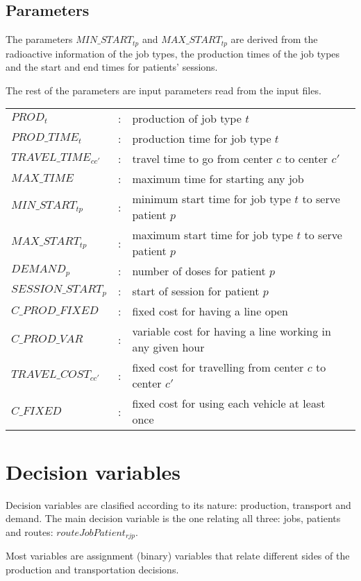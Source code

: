 \subsection{Parameters}

The parameters $MIN\_START_{tp}$ and $MAX\_START_{tp}$ are derived from the radioactive information of the job types, the production times of the job types and the start and end times for patients' sessions.

The rest of the parameters are input parameters read from the input files.

\begin{tabular}{p{40mm}lp{80mm}}
$PROD_t$ 								& : &		production of job type $t$ \\
$PROD\_TIME_t$ 					& : &	production time for job type $t$ \\
$TRAVEL\_TIME_{cc'}$ 		& : &	travel time to go from center $c$ to center $c'$ \\
$MAX\_TIME$ 						& : & maximum time for starting any job \\
$MIN\_START_{tp}$ 			& : & minimum start time for job type $t$ to serve patient $p$ \\
$MAX\_START_{tp}$ 			& : & maximum start time for job type $t$ to serve patient $p$ \\
$DEMAND_p$ 							& : & number of doses for patient $p$ \\
$SESSION\_START_p$ 			& : & start of session for patient $p$ \\
$C\_PROD\_FIXED$				& : & fixed cost for having a line open \\
$C\_PROD\_VAR$					& : & variable cost for having a line working in any given hour \\
$TRAVEL\_COST_{cc'}$		& : & fixed cost for travelling from center $c$ to center $c'$\\
$C\_FIXED$							& : & fixed cost for using each vehicle at least once\\
\end{tabular}
\bigskip

\section{Decision variables}

Decision variables are clasified according to its nature: production, transport and demand.
The main decision variable is the one relating all three: jobs, patients and routes: $routeJobPatient_{rjp}$.

Most variables are assignment (binary) variables that relate different sides of the production and transportation decisions.

